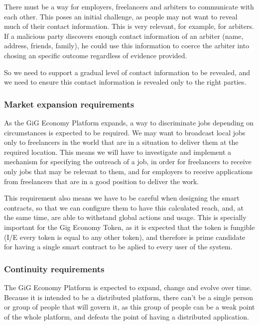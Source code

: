 \documentclass{article}
\begin{document}
There must be a way for employers, freelancers and arbiters to communicate with each other. This poses an initial challenge, as people may not want to reveal much of their contact information. This is very relevant, for example, for arbiters. If a malicious party discovers enough contact information of an arbiter (name, address, friends, family), he could use this information to coerce the arbiter into chosing an specific outcome regardless of evidence provided.

So we need to support a gradual level of contact information to be revealed, and we need to ensure this contact information is revealed only to the right parties.

\subsubsection{Market expansion requirements}

As the GiG Economy Platform expands, a way to discriminate jobs depending on circumstances is expected to be required. We may want to broadcast local jobs only to freelancers in the world that are in a situation to deliver them at the required location. This means we will have to investigate and implement a mechanism for specifying the outreach of a job, in order for freelancers to receive only jobs that may be relevant to them, and for employers to receive applications from freelancers that are in a good position to deliver the work.

This requirement also means we have to be careful when designing the smart contracts, so that we can configure them to have this calculated reach, and, at the same time, are able to withstand global actions and usage. This is specially important for the Gig Economy Token, as it is expected that the token is fungible (I/E every token is equal to any other token), and therefore is prime candidate for having a single smart contract to be aplied to every user of the system.

\subsubsection{Continuity requirements}

The GiG Economy Platform is expected to expand, change and evolve over time. Because it is intended to be a distributed platform, there can't be a single person or group of people that will govern it, as this group of people can be a weak point of the whole platform, and defeats the point of having a distributed application.
\end{document}
